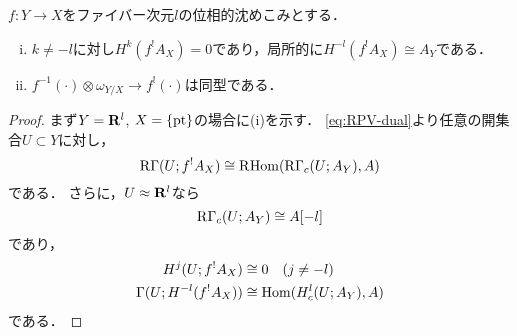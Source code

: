 \begin{PRP}\label{PRP:subm}
    \(f\colon Y\to X\)をファイバー次元\(l\)の位相的沈めこみとする．
    \begin{enumerate}[(i)]
        \item \(k\ne -l\)に対し\(H^k(f^!A_X)=0\)であり，局所的に\(H^{-l}(f^!A_X)\cong A_Y\)である．
        \item \(f^{-1}(\cdot)\otimes\omega_{Y/X}\to f^!(\cdot)\)は同型である．
    \end{enumerate}
\end{PRP}
\begin{proof}
    まず\(Y=\mathbf{R}^l\), \(X=\{\mathop{\mathrm{pt}}\nolimits\}\)の場合に(i)を示す．
    \eqref{eq:RPV-dual}より任意の開集合\(U\subset Y\)に対し，
    \[
        \mathop{\mathrm{R}\hspace{-0pt}\Gamma}\nolimits(U;f^!A_X)\cong\mathop{\mathrm{R}\hspace{-1.5pt}\mathop{\mathrm{Hom}}\nolimits}\nolimits(\mathop{\mathrm{R}\hspace{-0pt}\Gamma}\nolimits_c(U;A_Y),A)
    \]
    である．
    さらに，\(U\approx\mathbf{R}^l\)なら
    \[
        \mathop{\mathrm{R}\hspace{-0pt}\Gamma}\nolimits_c(U;A_Y)\cong A[-l]   
    \]
    であり，
    \begin{align*}
        H^j(U;f^!A_X)&\cong0 \quad (j\ne -l)\\
        \Gamma(U;H^{-l}(f^!A_X))
        &\cong
        \mathop{\mathrm{Hom}}\nolimits(H^l_c(U;A_Y),A)        
    \end{align*}
    である．


\end{proof}
